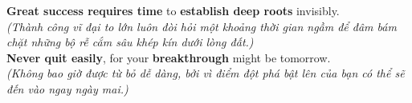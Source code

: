 \begin{baihoc}
  \textbf{Great success requires time} to \textbf{establish deep roots} invisibly.\\
  \textit{(Thành công vĩ đại to lớn luôn đòi hỏi một khoảng thời gian ngầm để đâm bám chặt những bộ rễ cắm sâu khép kín dưới lòng đất.)}\\
  \textbf{Never quit easily}, for your \textbf{breakthrough} might be tomorrow.\\
  \textit{(Không bao giờ được từ bỏ dễ dàng, bởi vì điểm đột phá bật lên của bạn có thể sẽ đến vào ngay ngày mai.)}
\end{baihoc}

\vspace{0.8cm}
